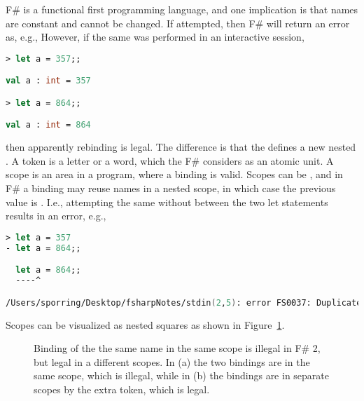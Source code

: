 F\# is a functional first programming language, and one implication is that names are constant and cannot be changed. If attempted, then F\# will return an error as, e.g.,
%
%
However, if the same was performed in an interactive session,
\begin{lstlisting}[language=fsharp,caption=fsharpi]
> let a = 357;;

val a : int = 357

> let a = 864;;

val a : int = 864
\end{lstlisting}
then apparently rebinding is legal. The difference is that the \idx{\token{;;}}  defines a new nested . A token is a letter or a word, which the F\# considers as an atomic unit. A scope is an area in a program, where a binding is valid. Scopes can be , and in F\# a binding may reuse names in a nested scope, in which case the previous value is . I.e., attempting the same without \token{;;} between the two let statements results in an error, e.g.,
\begin{lstlisting}[language=fsharp,caption=fsharpi]
> let a = 357
- let a = 864;;

  let a = 864;;
  ----^

/Users/sporring/Desktop/fsharpNotes/stdin(2,5): error FS0037: Duplicate definition of value 'a'
\end{lstlisting}
Scopes can be visualized as nested squares as shown in Figure~\ref{fig:scope}.
\begin{figure}
  \centering
  \caption{Binding of the the same name in the same scope is illegal in F\# 2, but legal in a different scopes. In (a) the two bindings are in the same scope, which is illegal, while in (b) the bindings are in separate scopes by the extra \token{;;} token, which is legal.}
  \label{fig:scope}
\end{figure}

